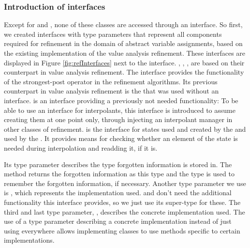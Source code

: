 \subsubsection{Introduction of interfaces}
Except for  and , none of these classes are accessed through an interface.
So first, we created interfaces with type parameters that represent all components required for refinement in the domain of abstract variable assignments, based on the existing implementation of the value analysis refinement. These interfaces are displayed in Figure \ref{fig:refInterfaces} next to the  interface.
, , ,  are based on their counterpart in value analysis refinement.
The interface  provides the functionality of the strongest-post operator in the refinement algorithms. Its previous counterpart in value analysis refinement is the  that was used without an interface.
 is an interface providing a previously not needed functionality:
To be able to use an interface for interpolants, this interface is introduced to assume creating them at one point only, through injecting an interpolant manager in other classes of refinement.
 is the interface for states used and created by the  and used by the .
It provides means for checking whether an element of the state is needed during interpolation and readding it, if it is.

Its type parameter  describes the type forgotten information is stored in.
The method  returns the forgotten information as this type and the type is used to remember the forgotten information, if necessary.
Another type parameter we use is , which represents the  implementation used.  and  don't need the additional functionality this interface provides,
so we just use its super-type  for these.
The third and last type parameter, , describes the concrete  implementation used.
The use of a type parameter describing a concrete implementation instead of just using  everywhere
allows implementing classes to use methods specific to certain implementations.

